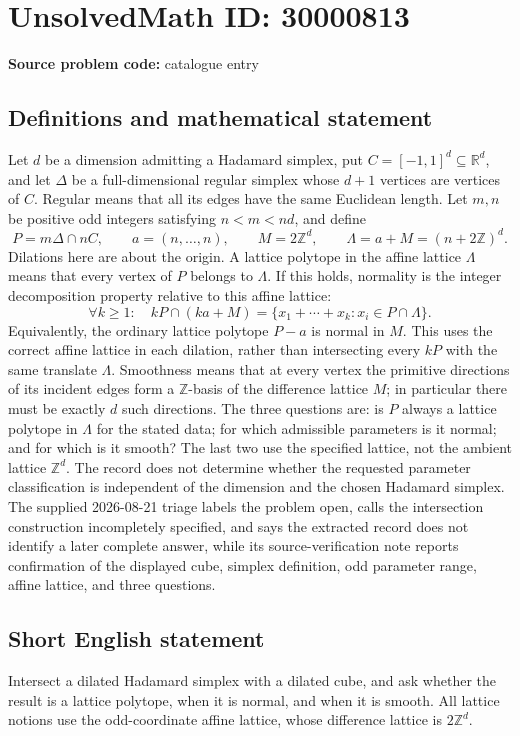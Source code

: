 \documentclass[11pt]{article}
\newcommand{\Z}{\mathbb{Z}}
\newcommand{\R}{\mathbb{R}}
\begin{document}
\section*{UnsolvedMath ID: 30000813}
\textbf{Source problem code:} catalogue entry
\subsection{Definitions and mathematical statement}
Let $d$ be a dimension admitting a Hadamard simplex, put $C=[-1,1]^d\subseteq\R^d$, and let $\Delta$ be a full-dimensional regular simplex whose $d+1$ vertices are vertices of $C$. Regular means that all its edges have the same Euclidean length. Let $m,n$ be positive odd integers satisfying $n<m<nd$, and define \[P=m\Delta\cap nC,\qquad a=(n,\ldots,n),\qquad M=2\Z^d,\qquad\Lambda=a+M=(n+2\Z)^d.\] Dilations here are about the origin. A lattice polytope in the affine lattice $\Lambda$ means that every vertex of $P$ belongs to $\Lambda$. If this holds, normality is the integer decomposition property relative to this affine lattice: \[\forall k\geq1:\quad kP\cap(ka+M)=\{x_1+\cdots+x_k:x_i\in P\cap\Lambda\}.\] Equivalently, the ordinary lattice polytope $P-a$ is normal in $M$. This uses the correct affine lattice in each dilation, rather than intersecting every $kP$ with the same translate $\Lambda$. Smoothness means that at every vertex the primitive directions of its incident edges form a $\Z$-basis of the difference lattice $M$; in particular there must be exactly $d$ such directions. The three questions are: is $P$ always a lattice polytope in $\Lambda$ for the stated data; for which admissible parameters is it normal; and for which is it smooth? The last two use the specified lattice, not the ambient lattice $\Z^d$. The record does not determine whether the requested parameter classification is independent of the dimension and the chosen Hadamard simplex. The supplied 2026-08-21 triage labels the problem open, calls the intersection construction incompletely specified, and says the extracted record does not identify a later complete answer, while its source-verification note reports confirmation of the displayed cube, simplex definition, odd parameter range, affine lattice, and three questions.
\subsection{Short English statement}
Intersect a dilated Hadamard simplex with a dilated cube, and ask whether the result is a lattice polytope, when it is normal, and when it is smooth. All lattice notions use the odd-coordinate affine lattice, whose difference lattice is $2\Z^d$.
\end{document}
